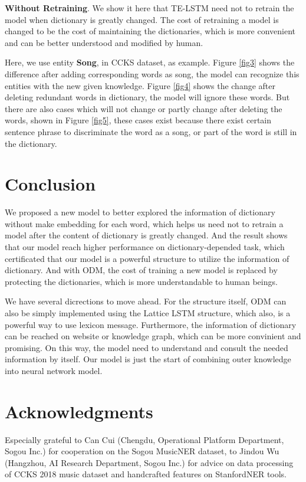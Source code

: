 \documentclass[letterpaper]{article} %
\begin{document}
\textbf{Without Retraining}. We show it here that TE-LSTM need not to retrain the model when dictionary is greatly changed. The cost of retraining a model is changed to be the cost of maintaining the dictionaries, which is more convenient and can be better understood and modified by human. 

Here, we use entity \textbf{Song}, in CCKS dataset, as example. Figure \ref{fig3} shows the difference after adding corresponding words as song, the model can recognize this entities with the new given knowledge. Figure \ref {fig4} shows the change after deleting redundant words in dictionary, the model will ignore these words. But there are also cases which will not change or partly change after deleting the words, shown in Figure \ref{fig5},  these cases exist because there exist certain sentence phrase to discriminate the word as a song,  or part of the word is still in the dictionary.



\section{Conclusion}

We proposed a new model to better explored the information of dictionary without make embedding for each word, which helps us need not to retrain a model after the content of dictionary is greatly changed. And the result shows that our model reach higher performance on dictionary-depended task, which certificated that our model is a powerful structure to utilize the information of dictionary. And with ODM, the cost of training a new model is replaced by protecting the dictionaries, which is more understandable to human beings.

We have several dicrections to move ahead. For the structure itself, ODM can also be simply implemented using the Lattice LSTM structure, which also, is a powerful way to use lexicon message. Furthermore, the information of dictionary can be reached on website or knowledge graph, which can be more convinient and promising. On this way, the model need to understand and consult the needed information by itself. Our model is just the start of combining outer knowledge into neural network model. 

\section{ Acknowledgments }
Especially grateful to Can Cui (Chengdu, Operational Platform Department, Sogou Inc.) for cooperation on the Sogou MusicNER dataset, to Jindou Wu (Hangzhou, AI Research Department, Sogou Inc.) for advice on data processing of CCKS 2018 music dataset and handcrafted features on StanfordNER tools.
\end{document}
